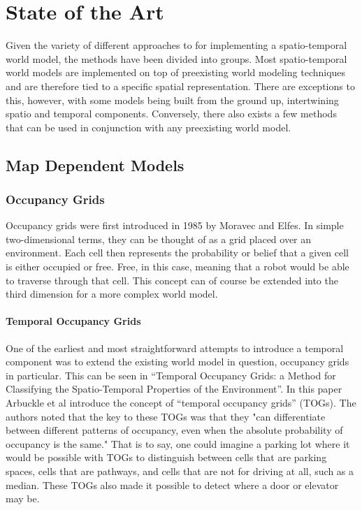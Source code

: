 
  \chapter{ State of the Art }

  Given the variety of different approaches to for implementing a spatio-temporal
  world model, the methods have been divided into groups. Most spatio-temporal
  world models are implemented on top of preexisting world modeling techniques
  and are therefore tied to a specific spatial
  representation. There are exceptions to this, however, with some models
  being built from the ground up, intertwining spatio and temporal components.
  Conversely, there also exists a few
  methods that can be used in conjunction with any preexisting world model. \\


  \section{ Map Dependent Models }

  \subsection{ Occupancy Grids }

  Occupancy grids were first introduced in 1985 by Moravec and Elfes. \cite{Elfes1985}
  In simple two-dimensional terms, they can be thought of as a grid placed
  over an environment. Each cell then represents the probability or belief that
  a given cell is either occupied or free. Free, in this case, meaning
  that a robot would be able to traverse through that cell. This concept can of
  course be extended into the third dimension for a more complex world model. \\

  \subsubsection{ Temporal Occupancy Grids }
  One of the earliest and most straightforward attempts to introduce a temporal
  component was to extend the existing world model in question, occupancy
  grids in particular. This can be seen in ``Temporal Occupancy Grids: a Method for
  Classifying the Spatio-Temporal Properties of the Environment''.
  \cite{Arbuckle2002} In this paper Arbuckle et al introduce the concept of
  ``temporal occupancy grids'' (TOGs). The authors noted that the key to these TOGs
  was that they "can differentiate between different patterns of occupancy, even
  when the absolute probability of occupancy is the same." That is to say, one
  could imagine a parking lot where it would be possible with TOGs to distinguish
  between cells that are parking spaces, cells that are pathways, and cells that
  are not for driving at all, such as a median. These TOGs also made it
  possible to detect where a door or elevator may be. \\

